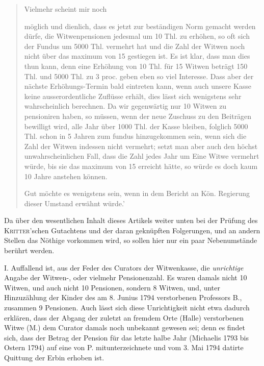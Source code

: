 \begin{quote}
Vielmehr scheint mir noch
\begin{list}{}{\setlength{\leftmargin}{1.8em}\setlength{\labelwidth}{1.4em}\setlength{\labelsep}{.4em}}
\item[3)] möglich und dienlich, dass es jetzt zur beständigen Norm gemacht werden dürfe, die Witwenpensionen jedesmal um 10 Thl. zu erhöhen, so oft sich der Fundus um 5000 Thl. vermehrt hat und die Zahl der Witwen noch nicht über das maximum von 15 gestiegen ist. Es ist klar, dass man dies thun kann, denn eine Erhöhung von 10 Thl. für 15 Witwen beträgt 150 Thl. und 5000 Thl. zu 3 proc. geben eben so viel Interesse. Dass aber der nächste Erhöhungs-Termin bald eintreten kann, wenn auch unsere Kasse keine ausserordentliche Zuflüsse erhält, dies lässt sich wenigstens sehr wahrscheinlich berechnen. Da wir gegenwärtig nur 10 Witwen zu pensioniren haben, so müssen, wenn der neue Zuschuss zu den Beiträgen bewilligt wird, alle Jahr über 1000 Thl. der Kasse bleiben, folglich 5000 Thl. schon in 5 Jahren zum fundus hinzugekommen sein, wenn sich die Zahl der Witwen indessen nicht vermehrt; setzt man aber auch den höchst unwahrscheinlichen Fall, dass die Zahl jedes Jahr um Eine Witwe vermehrt würde, bis sie das maximum von 15 erreicht hätte, so würde es doch kaum 10 Jahre anstehen können.
\end{list}
Gut möchte es wenigstens sein, wenn in dem Bericht an Kön. Regierung dieser Umstand erwähnt würde.’
\end{quote}

\noindent\hspace*{\parindent}Da über den wesentlichen Inhalt dieses Artikels weiter unten bei der Prüfung des \textsc{Kritter}’schen Gutachtens und der daran geknüpften Folgerungen, und an andern Stellen das Nöthige vorkommen wird, so sollen hier nur ein paar Nebenumstände berührt werden.

I. Auffallend ist, aus der Feder des Curators der Witwenkasse, die \textit{unrichtige} Angabe der Witwen-, oder vielmehr Pensionenzahl. Es waren damals nicht 10 Witwen, und auch nicht 10 Pensionen, sondern 8 Witwen, und, unter Hinzuzählung der Kinder des am 8. Junius 1794 verstorbenen Professors B., zusammen 9 Pensionen. Auch lässt sich diese Unrichtigkeit nicht etwa dadurch erklären, dass der Abgang der zuletzt an fremdem Orte (Halle) verstorbenen Witwe (M.) dem Curator damals noch unbekannt gewesen sei; denn es findet sich, dass der Betrag der Pension für das letzte halbe Jahr (Michaelis 1793 bis Ostern 1794) auf eine von P. mitunterzeichnete und vom 3. Mai 1794 datirte Quittung der Erbin erhoben ist.

